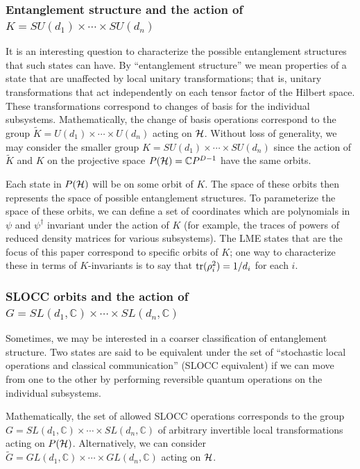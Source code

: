 \documentclass[12pt]{article}
\theoremstyle{definition}
\newcommand{\tr}{{\rm tr}}
\begin{document}
\subsubsection{Entanglement structure and the action of $K = SU(d_1) \times \cdots \times SU(d_n)$}

It is an interesting question to characterize the possible
entanglement structures that such states can have. By ``entanglement
structure'' we mean properties of a state that are unaffected by local
unitary transformations; that is, unitary transformations that act
independently on each tensor factor of the Hilbert space. These
transformations correspond to changes of basis for the individual
subsystems. Mathematically, the change of basis operations correspond
to the group $\tilde{K} = U(d_1) \times \cdots \times U(d_n)$ acting
on ${\cal H}$. Without loss of generality, we may consider the smaller
group $K = SU(d_{1})\times \dotsb \times SU(d_{n})$ since the action
of $\tilde{K}$ and $K$ on the projective space $P({\cal H}) = \mathbb{C}
P^{D-1}$ have the same orbits.


Each state in $P({\cal H})$ will be on some orbit of $K$. The space of these orbits then represents the space of possible entanglement structures. To parameterize the space of these orbits, we can define a set of coordinates which are polynomials in $\psi$ and $\psi^\dagger$ invariant under the action of $K$ (for example, the traces of powers of reduced density matrices for various subsystems). The LME states that are the focus of this paper correspond to specific orbits of $K$; one way to characterize these in terms of $K$-invariants is to say that $\tr(\rho_i^2) = 1/d_i$ for each $i$.

\subsubsection{SLOCC orbits and the action of $G = SL(d_1,\mathbb{C}) \times \cdots \times SL(d_n,\mathbb{C})$}

Sometimes, we may be interested in a coarser classification of entanglement structure. Two states are said to be equivalent under the set of ``stochastic local operations and classical communication'' (SLOCC equivalent) if we can move from one to the other by performing reversible quantum operations on the individual subsystems.

Mathematically, the set of allowed SLOCC operations corresponds to the group $G = SL(d_1, \mathbb{C}) \times \cdots \times SL(d_n, \mathbb{C})$ of arbitrary invertible local transformations acting on $P({\cal H})$. Alternatively, we can consider $\tilde{G} =  GL(d_1, \mathbb{C}) \times \cdots \times GL(d_n, \mathbb{C})$ acting on ${\cal H}$.
\end{document}
